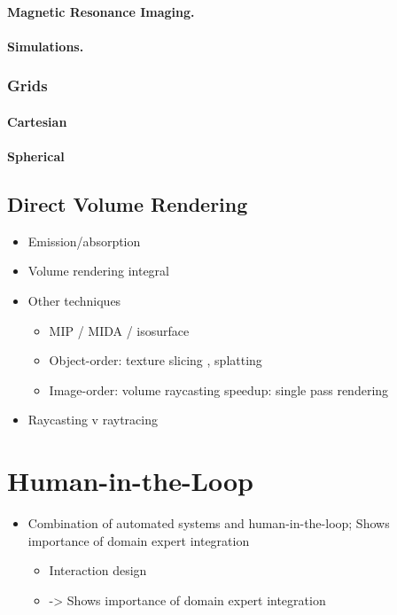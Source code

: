 \paragraph{Magnetic Resonance Imaging. }
\paragraph{Simulations. }

\subsubsection{Grids} \label{cha:intro:vp:da:grids}
\paragraph{Cartesian}

\paragraph{Spherical}

\subsection{Direct Volume Rendering} \label{cha:intro:vp:dvr}
\begin{itemize}
  \item Emission/absorption \cite{sabella1988rendering}
  \item Volume rendering integral \cite{max1995optical}
  \item Other techniques
  \begin{itemize}
    \item MIP / MIDA / isosurface
    \item Object-order: texture slicing \cite{westermann1998efficiently}, splatting \cite{westover1990footprint}
    \item Image-order: volume raycasting \cite{levoy1988display, drebin1988volume,sabella1988rendering} speedup: \cite{kruger2003acceleration} single pass rendering \cite{hadwiger2005real, stegmaier2005simple}
  \end{itemize}
  \item Raycasting v raytracing
\end{itemize}

\section{Human-in-the-Loop} \label{cha:intro:hitl}
\begin{itemize}
  \item Combination of automated systems and human-in-the-loop; Shows importance of domain expert integration
  \begin{itemize}
    \item Interaction design
    \item \cite{munzner2014visualization} \cite{van2005value} -> Shows importance of domain expert integration
  \end{itemize}
\end{itemize}
